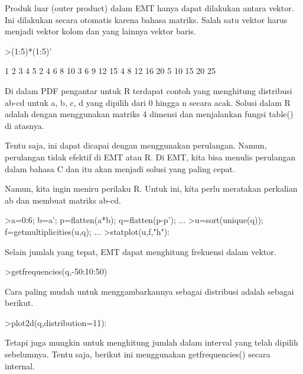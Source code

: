\documentclass[a4paper,10pt]{article}
\begin{document}
\begin{eulernotebook}
\begin{eulercomment}
\begin{eulercomment}
\begin{eulercomment}
\begin{eulercomment}
\begin{eulercomment}
Produk luar (outer product) dalam EMT hanya dapat dilakukan antara
vektor. Ini dilakukan secara otomatis karena bahasa matriks. Salah
satu vektor harus menjadi vektor kolom dan yang lainnya vektor baris.
\end{eulercomment}
\begin{eulerprompt}
>(1:5)*(1:5)'
\end{eulerprompt}
\begin{euleroutput}
          1         2         3         4         5 
          2         4         6         8        10 
          3         6         9        12        15 
          4         8        12        16        20 
          5        10        15        20        25 
\end{euleroutput}
\begin{eulercomment}
Di dalam PDF pengantar untuk R terdapat contoh yang menghitung
distribusi ab-cd untuk a, b, c, d yang dipilih dari 0 hingga n secara
acak. Solusi dalam R adalah dengan menggunakan matriks 4 dimensi dan
menjalankan fungsi table() di atasnya.

Tentu saja, ini dapat dicapai dengan menggunakan perulangan. Namun,
perulangan tidak efektif di EMT atau R. Di EMT, kita bisa menulis
perulangan dalam bahasa C dan itu akan menjadi solusi yang paling
cepat.

Namun, kita ingin meniru perilaku R. Untuk ini, kita perlu meratakan
perkalian ab dan membuat matriks ab-cd.
\end{eulercomment}
\begin{eulerprompt}
>a=0:6; b=a'; p=flatten(a*b); q=flatten(p-p'); ...
>u=sort(unique(q)); f=getmultiplicities(u,q); ...
>statplot(u,f,"h"):
\end{eulerprompt}
\begin{eulercomment}
Selain jumlah yang tepat, EMT dapat menghitung frekuensi dalam vektor.
\end{eulercomment}
\begin{eulerprompt}
>getfrequencies(q,-50:10:50)
\end{eulerprompt}
\begin{euleroutput}
  [0,  23,  132,  316,  602,  801,  333,  141,  53,  0]
\end{euleroutput}
\begin{eulercomment}
Cara paling mudah untuk menggambarkannya sebagai distribusi adalah
sebagai berikut.
\end{eulercomment}
\begin{eulerprompt}
>plot2d(q,distribution=11):
\end{eulerprompt}
\begin{eulercomment}
Tetapi juga mungkin untuk menghitung jumlah dalam interval yang telah
dipilih sebelumnya. Tentu saja, berikut ini menggunakan
getfrequencies() secara internal.


\end{eulercomment}
\end{eulercomment}
\end{eulercomment}
\end{eulercomment}
\end{eulercomment}
\end{eulernotebook}
\end{document}

